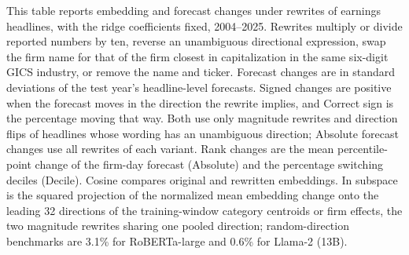 \begin{table}[htbp]
\centering
\caption{Forecast and Embedding Changes under Headline Rewrites}
\label{tab:tabA_rewrites}
\begin{minipage}{\linewidth}\footnotesize
This table reports embedding and forecast changes under rewrites of earnings headlines, with the ridge coefficients fixed, 2004--2025. Rewrites multiply or divide reported numbers by ten, reverse an unambiguous directional expression, swap the firm name for that of the firm closest in capitalization in the same six-digit GICS industry, or remove the name and ticker. Forecast changes are in standard deviations of the test year's headline-level forecasts. Signed changes are positive when the forecast moves in the direction the rewrite implies, and Correct sign is the percentage moving that way. Both use only magnitude rewrites and direction flips of headlines whose wording has an unambiguous direction; Absolute forecast changes use all rewrites of each variant. Rank changes are the mean percentile-point change of the firm-day forecast (Absolute) and the percentage switching deciles (Decile). Cosine compares original and rewritten embeddings. In subspace is the squared projection of the normalized mean embedding change onto the leading 32 directions of the training-window category centroids or firm effects, the two magnitude rewrites sharing one pooled direction; random-direction benchmarks are 3.1\% for RoBERTa-large and 0.6\% for Llama-2 (13B).
\end{minipage}
\medskip


\end{table}
